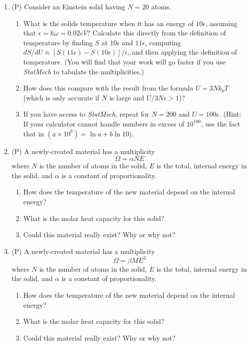 \begin{enumerate}
\item (P) Consider an Einstein solid having $N = 20$ atoms.  
\begin{enumerate}
\item What is the solids temperature when it has an energy of $10\epsilon$, 
assuming that $\epsilon =h\omega = 0.02 eV$?  Calculate this directly from the 
definition of temperature by finding $S$ at $10\epsilon$ and $11\epsilon$, computing 
$dS/dU \approx [S(11\epsilon) - S(10\epsilon)]/\epsilon$, and then applying 
the definition of temperature.  (You will find that your work will 
go faster if you use {\it StatMech} to tabulate the multiplicities.)
\item How does this compare with the result from the formula $U = 3Nk_bT$ 
(which is only accurate if $N$ is large and $U/3N\epsilon > 1$)?
\item If you have access to {\it StatMech}, repeat for 
$N = 200$ and $U =100\epsilon$.  
(Hint:  If your calculator cannot handle numbers in excess of $10^{100}$, 
use the fact that in $(a \times 10^b) = \ln a + b \ln 10 $).
\end{enumerate}

\item (P)  A newly-created material has a multiplicity
$$
\Omega = \alpha N E
$$
where $N$ is the number of atoms in the solid,
$E$ is the total, internal energy in the solid, and $\alpha$ is a constant of 
proportionality.
\begin{enumerate}
\item How does the temperature of the new material depend on the internal energy?
\item What is the molar heat capacity for this solid?
\item Could this material really exist? Why or why not?
\end{enumerate}

\item (P)  A newly-created material has a multiplicity
$$
\Omega = \beta M E^2
$$
where $N$ is the number of atoms in the solid,
$E$ is the total, internal energy in the solid, and $\alpha$ is a constant of 
proportionality.
\begin{enumerate}
\item How does the temperature of the new material depend on the internal energy?
\item What is the molar heat capacity for this solid?
\item Could this material really exist? Why or why not?
\end{enumerate}


\end{enumerate}


